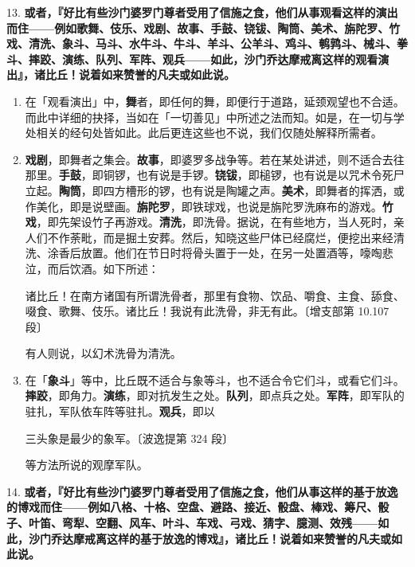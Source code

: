 {\Large 13.} \textbf{或者，『好比有些沙门婆罗门尊者受用了信施之食，他们从事观看这样的演出而住——例如歌舞、伎乐、戏剧、故事、手鼓、铙钹、陶筒、美术、旃陀罗、竹戏、清洗、象斗、马斗、水牛斗、牛斗、羊斗、公羊斗、鸡斗、鹌鹑斗、械斗、拳斗、摔跤、演练、队列、军阵、观兵——如此，沙门乔达摩戒离这样的观看演出』，诸比丘！说着如来赞誉的凡夫或如此说。}

\begin{enumerate}\item 在「观看演出」中，\textbf{舞}者，即任何的舞，即便行于道路，延颈观望也不合适。而此中详细的抉择，当如在「一切善见」中所述之法而知。如是，在一切与学处相关的经句处皆如此。此后更连这些也不说，我们仅随处解释所需者。
\item \textbf{戏剧}，即舞者之集会。\textbf{故事}，即婆罗多战争等。若在某处讲述，则不适合去往那里。\textbf{手鼓}，即铜锣，也有说是手锣。\textbf{铙钹}，即槌锣，也有说是以咒术令死尸立起。\textbf{陶筒}，即四方槽形的锣，也有说是陶罐之声。\textbf{美术}，即舞者的挥洒，或作美化，即是说壁画。\textbf{旃陀罗}，即铁球戏，也说是旃陀罗洗麻布的游戏。\textbf{竹戏}，即先架设竹子再游戏。\textbf{清洗}，即洗骨。据说，在有些地方，当人死时，亲人们不作荼毗，而是掘土安葬。然后，知晓这些尸体已经腐烂，便挖出来经清洗、涂香后放置。他们在节日时将骨头置于一处，在另一处置酒等，嚎啕悲泣，而后饮酒。如下所述：\begin{quoting}诸比丘！在南方诸国有所谓洗骨者，那里有食物、饮品、嚼食、主食、舔食、啜食、歌舞、伎乐。诸比丘！我说有此洗骨，非无有此。{\bluefootnotesize 〔增支部第 10.107 段〕}\end{quoting}有人则说，以幻术洗骨为清洗。
\item 在「\textbf{象斗}」等中，比丘既不适合与象等斗，也不适合令它们斗，或看它们斗。\textbf{摔跤}，即角力。\textbf{演练}，即对抗发生之处。\textbf{队列}，即点兵之处。\textbf{军阵}，即军队的驻扎，军队依车阵等驻扎。\textbf{观兵}，即以\begin{quoting}三头象是最少的象军。{\bluefootnotesize 〔波逸提第 324 段〕}\end{quoting}等方法所说的观摩军队。\end{enumerate}

{\Large 14.} \textbf{或者，『好比有些沙门婆罗门尊者受用了信施之食，他们从事这样的基于放逸的博戏而住——例如八格、十格、空盘、避路、接近、骰盘、棒戏、筹尺、骰子、叶笛、弯犁、空翻、风车、叶斗、车戏、弓戏、猜字、臆测、效残——如此，沙门乔达摩戒离这样的基于放逸的博戏』，诸比丘！说着如来赞誉的凡夫或如此说。}


